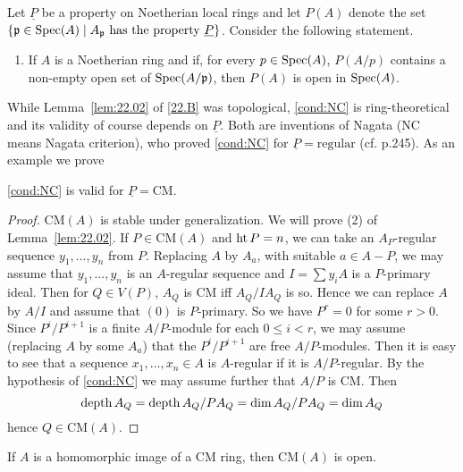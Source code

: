 \documentclass[../main]{subfiles}
\begin{document}
\newparagraph
Let $\underline{P}$ be a property on Noetherian local rings and let $P(A)$ denote the set $\left\{\mathfrak{p} \in \operatorname{Spec}(A) \mid A_{\mathfrak{p}} \text{ has the property } \underline{P}\right\}$. Consider the following statement. 
\begin{enumerate}[label=(NC), ref=(NC)]
    \item\label{cond:NC} If $A$ is a Noetherian ring and if, for every $p\in \operatorname{Spec}(A)$, $P(A/p)$ contains a non-empty open set of $\operatorname{Spec}(A/\mathfrak{p})$, then $P(A)$ is open in $\operatorname{Spec}(A)$. 
\end{enumerate}
While Lemma~\ref{lem:22.02} of \ref{22.B} was topological, \ref{cond:NC} is ring-theoretical and its validity of course depends on $\underline{P}$. Both are inventions of Nagata (NC means Nagata criterion), who proved \ref{cond:NC} for $\underline{P} = \text{regular}$ (cf. p.245). As an example we prove 
\begin{proposition*}
    \ref{cond:NC} is valid for $\underline{P} = \mathrm{CM}$.
\end{proposition*}
\begin{proof}
    $\mathrm{CM}(A)$ is stable under generalization. We will prove (2) of Lemma~\ref{lem:22.02}. If $P \in \mathrm{CM}(A)$ and $\operatorname{ht} P = n$, we can take an $A_P$-regular sequence $y_1, \dots, y_n$ from $P$. Replacing $A$ by $A_a$, with suitable $a \in A - P$, we may assume that $y_1,\dots, y_n$ is an $A$-regular sequence and $I =\sum y_iA$ is a $P$-primary ideal. Then for $Q\in V(P)$, $A_Q$ is CM iff $A_Q/ IA_Q$ is so. Hence we can replace $A$ by $A/I$ and assume that $(0)$ is $P$-primary. So we have $P^r = 0$ for some $r > 0$. Since $P^i/P^{i+1}$ is a finite $A/P$-module for each $0\le i< r$, we may assume (replacing $A$ by some $A_a$) that the $P^i/P^{i+1}$ are free $A/P$-modules. Then it is easy to see that a sequence $x_1, \dots, x_n \in A$ is $A$-regular if it is $A/P$-regular. By the hypothesis of \ref{cond:NC} we may assume further that $A/P$ is CM. Then \[\operatorname{depth} A_Q = \operatorname{depth} A_Q/PA_Q = \operatorname{dim} A_Q/PA_Q = \operatorname{dim} A_Q\] hence $Q\in\mathrm{CM}(A)$. 
\end{proof}

\begin{exercise*}
    If $A$ is a homomorphic image of a CM ring, then $\mathrm{CM}(A)$ is open. 
\end{exercise*}
\end{document}
